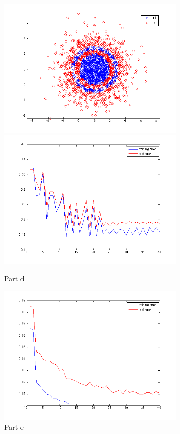 \documentclass[11pt]{article}
\begin{document}
\begin{itemize}
		\begin{figure}[h]
			\centering
			\includegraphics[width=3.5in]{part_d_scatter.png}
			\includegraphics[width=3.5in]{part_d.png}
			\caption{Part d}
		\end{figure}
	
		\begin{figure}[h]
			\centering
			\includegraphics[width=3.5in]{part_e.png}
			\caption{Part e}
		\end{figure}

\end{itemize}
\end{document}
